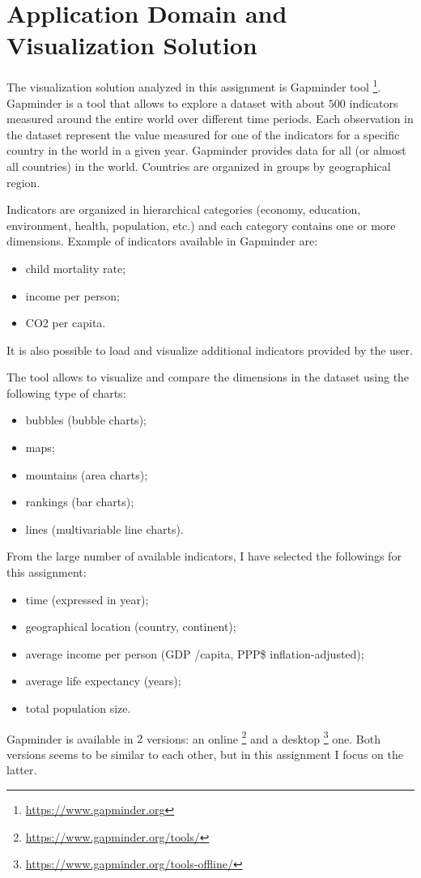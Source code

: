 \section{Application Domain and Visualization Solution}
\label{sec:visualization_solution}

The visualization solution analyzed in this assignment is Gapminder tool \footnote{\url{https://www.gapminder.org}}.
Gapminder is a tool that allows to explore a dataset with about $500$ indicators measured around the entire world over different time periods.
Each observation in the dataset represent the value measured for one of the indicators for a specific country in the world in a given year.
Gapminder provides data for all (or almost all countries) in the world.
Countries are organized in groups by geographical region.

Indicators are organized in hierarchical categories (economy, education, environment, health, population, etc.) and each category contains one or more dimensions.
Example of indicators available in Gapminder are:
\begin{itemize}
    \item child mortality rate;
    \item income per person;
    \item CO2 per capita.
\end{itemize}
It is also possible to load and visualize additional indicators provided by the user.

The tool allows to visualize and compare the dimensions in the dataset using the following type of charts:
\begin{itemize}
    \item bubbles (bubble charts);
    \item maps;
    \item mountains (area charts);
    \item rankings (bar charts);
    \item lines (multivariable line charts).
\end{itemize}

\vspace{5mm}

From the large number of available indicators, I have selected the followings for this assignment:
\begin{itemize}
    \item time (expressed in year);
    \item geographical location (country, continent);
    \item average income per person (GDP /capita, PPP\$ inflation-adjusted);
    \item average life expectancy (years);
    \item total population size.
\end{itemize}

Gapminder is available in $2$ versions: an online \footnote{\url{https://www.gapminder.org/tools/}} and a desktop \footnote{\url{https://www.gapminder.org/tools-offline/}} one.
Both versions seems to be similar to each other, but in this assignment I focus on the latter.
